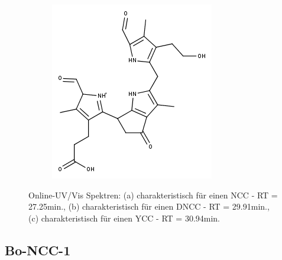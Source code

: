 \begin{figure}[!htbp]
\begin{subfigure}[b]{0.5\textwidth}
    \includegraphics[width=\textwidth]{figures/Kapitel7/Kataboliten/fragmentation_structures/VWA_Katabolit_647-CO2-RingD_480_MH_Ketoform.png}
    \caption{}
    \label{fig:DNCC2991}
  \end{subfigure}
  \caption[Online-UV/Vis Spektren mit der Charakteristik eines NCC bei 27.10min., eines DNCC bei 29.75min. sowie eines YCC bei 30.94min., Quelle: Autor]{Online-UV/Vis Spektren: (a) charakteristisch für einen \gls{NCC} - RT = 27.25min., (b) charakteristisch für einen \gls{DNCC} - RT = 29.91min., (c) charakteristisch für einen \gls{YCC} - RT = 30.94min.}
\end{figure}

\subsection{Bo-NCC-1}

